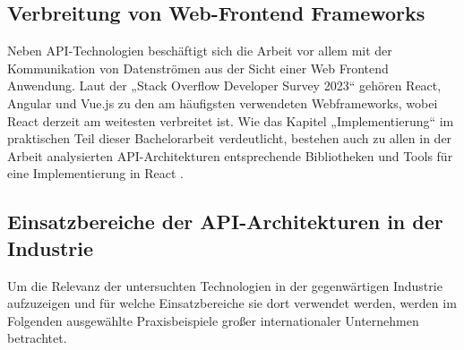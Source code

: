 \subsection{Verbreitung von Web-Frontend Frameworks}
Neben API-Technologien beschäftigt sich die Arbeit vor allem mit der Kommunikation von Datenströmen aus der Sicht einer Web Frontend Anwendung. Laut der „Stack Overflow Developer Survey 2023“ gehören React, Angular und Vue.js  zu den am häufigsten verwendeten Webframeworks, wobei React derzeit am weitesten verbreitet ist. Wie das Kapitel „Implementierung“ im praktischen Teil dieser Bachelorarbeit verdeutlicht, bestehen auch zu allen in der Arbeit analysierten API-Architekturen entsprechende Bibliotheken und Tools für eine Implementierung in React \parencite{stackoverflow2023}.

\subsection{Einsatzbereiche der API-Architekturen in der Industrie}
Um die Relevanz der untersuchten Technologien in der gegenwärtigen Industrie aufzuzeigen und für welche Einsatzbereiche sie dort verwendet werden, werden im Folgenden ausgewählte Praxisbeispiele großer internationaler Unternehmen betrachtet. 

